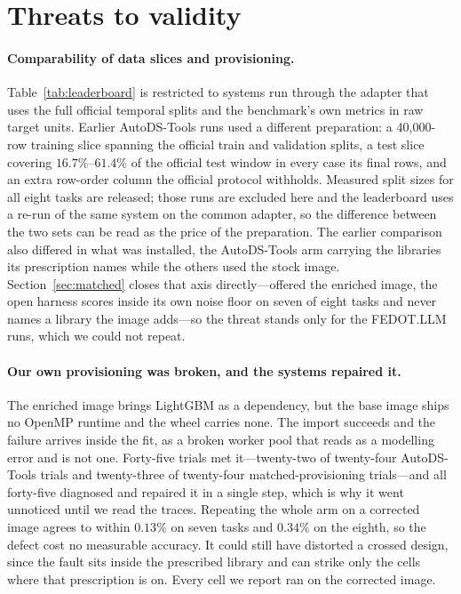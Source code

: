 \section{Threats to validity}
\label{sec:threats}

\paragraph{Comparability of data slices and provisioning.} Table~\ref{tab:leaderboard}
is restricted to systems run through the adapter that uses the full official
temporal splits and the benchmark's own metrics in raw target units. Earlier
AutoDS-Tools runs used a different preparation: a 40{,}000-row training slice
spanning the official train and validation splits, a test slice covering
$16.7\%$--$61.4\%$ of the official test window in every case its final rows, and
an extra row-order column the official protocol withholds. Measured split sizes
for all eight tasks are released; those runs are excluded here and the
leaderboard uses a re-run of the same system on the common adapter, so the
difference between the two sets can be read as the price of the preparation. The
earlier comparison also differed in what was installed, the AutoDS-Tools arm
carrying the libraries its prescription names while the others used the stock
image. Section~\ref{sec:matched} closes that axis directly---offered the enriched
image, the open harness scores inside its own noise floor on seven of eight tasks
and never names a library the image adds---so the threat stands only for the
FEDOT.LLM runs, which we could not repeat.

\paragraph{Our own provisioning was broken, and the systems repaired it.} The
enriched image brings LightGBM as a dependency, but the base image ships no
OpenMP runtime and the wheel carries none. The import succeeds and the failure
arrives inside the fit, as a broken worker pool that reads as a modelling error
and is not one. Forty-five trials met it---twenty-two of twenty-four
AutoDS-Tools trials and twenty-three of twenty-four matched-provisioning
trials---and all forty-five diagnosed and repaired it in a single step, which is
why it went unnoticed until we read the traces. Repeating the whole arm on a
corrected image agrees to within $0.13\%$ on seven tasks and $0.34\%$ on the
eighth, so the defect cost no measurable accuracy. It could still have distorted
a crossed design, since the fault sits inside the prescribed library and can
strike only the cells where that prescription is on. Every cell we report ran on
the corrected image.


